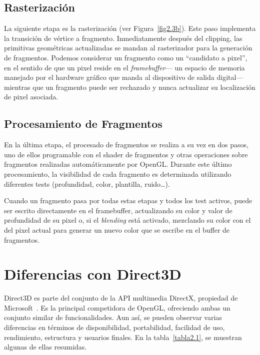 \subsection{Rasterización}
\label{ref:rasterizacion}

La siguiente etapa es la rasterización (ver Figura~\ref{fig2.3b}). Este paso
implementa la transición de vértice a fragmento. Inmediatamente después del
clipping, las primitivas geométricas actualizadas se mandan al rasterizador para
la generación de fragmentos. Podemos considerar un fragmento como un ``candidato
a pixel'', en el sentido de que un pixel reside en el \textit{framebuffer}--- un
espacio de memoria manejado por el hardware gráfico que manda al dispositivo de
salida digital--- mientras que un fragmento puede ser rechazado y nunca
actualizar su localización de pixel asociada. 

\subsection{Procesamiento de Fragmentos}
\label{ref:procesamientofrags}

En la última etapa, el procesado de fragmentos se realiza a su vez en dos pasos,
uno de ellos programable con el shader de fragmentos y otras operaciones sobre
fragmentos realizadas automáticamente por OpenGL.  Durante este último
procesamiento, la visibilidad de cada fragmento es determinada utilizando
diferentes tests (profundidad, color, plantilla, ruido\ldots). 

Cuando un fragmento pasa por todas estas etapas y todos los test activos, puede
ser escrito directamente en el framebuffer, actualizando su color y valor de
profundidad de su pixel o, si el \textit{blending} está activado, mezclando su
color con el del pixel actual para generar un nuevo color que se escribe en el
buffer de fragmentos.

\section{Diferencias con Direct3D}
\label{makereference2.4}

Direct3D es parte del conjunto de la API multimedia DirectX, propiedad de
Microsoft~\cite{Microsoft}. Es la principal competidora de OpenGL, ofreciendo
ambas un conjunto similar de funcionalidades. Aun así, se pueden observar varias
diferencias en términos de disponibilidad, portabilidad, facilidad de uso,
rendimiento, estructura y usuarios finales. En la tabla~\ref{tabla2.1}, se
muestran algunas de ellas resumidas.

